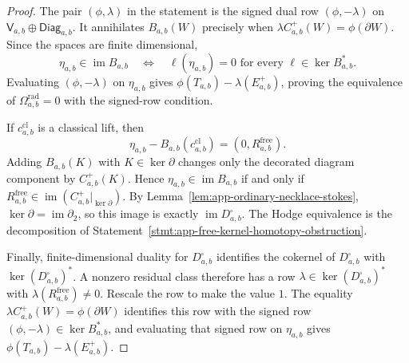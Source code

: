 \begin{proof}
  The pair \((\phi,\lambda)\) in the statement is the signed dual row
  \((\phi,-\lambda)\) on
  \(\mathsf V_{a,b}\oplus\mathsf{Diag}_{a,b}\).  It annihilates
  \(B_{a,b}(W)\) precisely when
  \(\lambda C^+_{a,b}(W)=\phi(\partial W)\).  Since the spaces are finite
  dimensional,
  \[
    \eta_{a,b}\in\operatorname{im}B_{a,b}
    \quad\Longleftrightarrow\quad
    \ell(\eta_{a,b})=0
    \text{ for every }\ell\in\ker B_{a,b}^* .
  \]
  Evaluating \((\phi,-\lambda)\) on \(\eta_{a,b}\) gives
  \(\phi(T_{a,b})-\lambda(E^+_{a,b})\), proving the equivalence of
  \(\Omega^{\mathrm{rad}}_{a,b}=0\) with the signed-row condition.

  If \(c^{\mathrm{cl}}_{a,b}\) is a classical lift, then
  \[
    \eta_{a,b}-B_{a,b}(c^{\mathrm{cl}}_{a,b})
    =
    (0,R^{\mathrm{free}}_{a,b}).
  \]
  Adding \(B_{a,b}(K)\) with \(K\in\ker\partial\) changes only the
  decorated diagram component by \(C^+_{a,b}(K)\).  Hence
  \(\eta_{a,b}\in\operatorname{im}B_{a,b}\) if and only if
  \(R^{\mathrm{free}}_{a,b}\in
  \operatorname{im}(C^+_{a,b}|_{\ker\partial})\).  By
  Lemma~\ref{lem:app-ordinary-necklace-stokes},
  \(\ker\partial=\operatorname{im}\partial_2\), so this image is exactly
  \(\operatorname{im}D^\square_{a,b}\).  The Hodge equivalence is the
  decomposition of
  Statement~\ref{stmt:app-free-kernel-homotopy-obstruction}.

  Finally, finite-dimensional duality for \(D^\square_{a,b}\) identifies
  the cokernel of \(D^\square_{a,b}\) with \(\ker(D^\square_{a,b})^*\).
  A nonzero residual class therefore has a row
  \(\lambda\in\ker(D^\square_{a,b})^*\) with
  \(\lambda(R^{\mathrm{free}}_{a,b})\ne0\).  Rescale the row to make the
  value \(1\).  The equality
  \(\lambda C^+_{a,b}(W)=\phi(\partial W)\) identifies this row with the
  signed row \((\phi,-\lambda)\in\ker B_{a,b}^*\), and evaluating that
  signed row on \(\eta_{a,b}\) gives
  \(\phi(T_{a,b})-\lambda(E^+_{a,b})\).
\end{proof}

